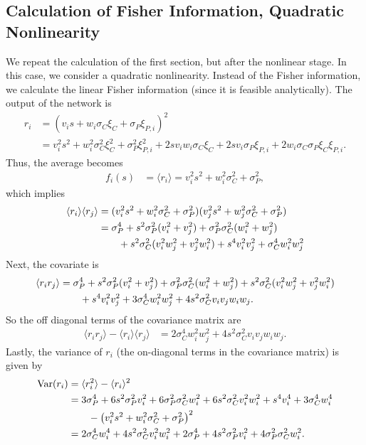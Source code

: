 \documentclass[12pt]{article}
\begin{document}
\subsection{Calculation of Fisher Information, Quadratic Nonlinearity}\label{app:fisher-quadratic}
We repeat the calculation of the first section, but after the nonlinear stage. In this case, we consider a quadratic nonlinearity. Instead of the Fisher information, we calculate the linear Fisher information (since it is feasible analytically). The output of the network is 
\begin{align}
	r_i &= (v_i s + w_i \sigma_C \xi_C + \sigma_P \xi_{P,i})^2 \\
	&= v_i^2 s^2 + w_i^2 \sigma_C^2 \xi_C^2 +  \sigma_P^2 \xi_{P,i}^2 + 2s v_i w_i \sigma_C \xi_C + 2 sv_i  \sigma_P \xi_{P,i} + 2w_i \sigma_C \sigma_P \xi_{C} \xi_{P,i}.
\end{align}
Thus, the average becomes 
\begin{align}
	f_i(s) &= \langle r_i \rangle = v_i^2 s^2 + w_i^2 \sigma_C^2 + \sigma_P^2,
\end{align}
	which implies 
\begin{align}
	\langle r_i \rangle  \langle r_j \rangle &= (v_i^2 s^2 + w_i^2 \sigma_C^2 + \sigma_P^2)(v_j^2 s^2 + w_j^2 \sigma_C^2 + \sigma_P^2)\\
	&= \sigma_P^4 + s^2 \sigma_P^2 (v_i^2 + v_j^2)  + \sigma_P^2 \sigma_C^2 (w_i^2 + w_j^2) \notag \\
	& \qquad + s^2 \sigma_C^2 (v_i^2 w_j^2 + v_j^2 w_i^2) + s^4 v_i^2 v_j^2+ \sigma_C^4 w_i^2 w_j^2
\end{align}
Next, the covariate is 
\begin{align}
	\langle r_i r_j \rangle &=  \sigma_P^4 + s^2 \sigma_P^2 (v_i^2 + v_j^2) + \sigma_P^2 \sigma_C^2 (w_i^2 + w_j^2) + s^2 \sigma_C^2 (v_i^2 w_j^2 + v_j^2 w_i^2) \notag \\
	& \qquad + s^4 v_i^2 v_j^2 + 3\sigma_C^4 w_i^2 w_j^2 + 4s^2 \sigma_C^2 v_i v_j w_i w_j.
\end{align}
So the off diagonal terms of the covariance matrix are 	
\begin{align}
	\langle r_i r_j \rangle - \langle r_i \rangle \langle r_j \rangle &= 2 \sigma_C^4 w_i^2 w_j^2 + 4s^2 \sigma_C^2 v_i v_j w_i w_j.
\end{align}
Lastly, the variance of $r_i$ (the on-diagonal terms in the covariance matrix) is given by 
\begin{align}
	\text{Var}(r_i) &= \langle r_i^2 \rangle - \langle r_i\rangle^2 \\
	&= 3\sigma_P^4 + 6s^2\sigma_P^2  v_i^2  +6 \sigma_P^2 \sigma_C^2  w_i^2+  6s^2 \sigma_C^2 v_i^2 w_i^2+ s^4 v_i^4 + 3\sigma_C^4 w_i^4 \notag \\ 
	& \qquad -\left(v_i^2 s^2 + w_i^2 \sigma_C^2 + \sigma_P^2\right)^2 \\
	&= 2\sigma_C^4 w_i^4 + 4s^2 \sigma_C^2 v_i^2 w_i^2 + 2\sigma_P^4 + 4s^2 \sigma_P^2 v_i^2  + 4\sigma_P^2\sigma_C^2 w_i^2.
\end{align}
\end{document}
